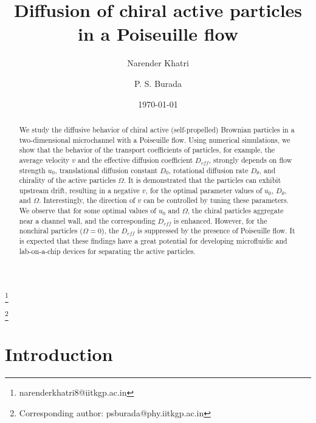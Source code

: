 \documentclass[aps,pre,preprint,superscriptaddress,amsmath,amssymb,nofootinbib]{revtex4}
\begin{document}
\title{Diffusion of chiral active particles in a Poiseuille flow}
	
\author{Narender Khatri}\thanks{narenderkhatri8@iitkgp.ac.in}

\author{P. S. Burada}\thanks{Corresponding author: psburada@phy.iitkgp.ac.in}


\date{\today}
	
\begin{abstract} 
 We study the diffusive behavior of chiral active (self-propelled) Brownian particles in a two-dimensional microchannel with a Poiseuille flow. 
Using numerical simulations, we show that the behavior of the transport coefficients of particles, for example, the average velocity $v$ and the effective diffusion coefficient $D_{eff}$, strongly depends on flow strength $u_0$, translational diffusion constant $D_0$, rotational diffusion rate $D_\theta$, and chirality of the active particles $\Omega$.
It is demonstrated that the particles can exhibit upstream drift, resulting in a negative $v$, for the optimal parameter values of $u_0$, $D_\theta$, and $\Omega$. 
Interestingly, the direction of $v$ can be controlled by tuning these parameters. 
We observe that for some optimal values of $u_0$ and $\Omega$, the chiral particles aggregate near a channel wall, and the corresponding $D_{eff}$ is enhanced. 
However, for the nonchiral particles ($\Omega = 0$), the $D_{eff}$ is suppressed by the presence of Poiseuille flow.
 It is expected that these findings have a great potential for developing microfluidic and lab-on-a-chip devices for separating the active particles. 
\end{abstract}
	
\maketitle

\section{Introduction}
\end{document}
